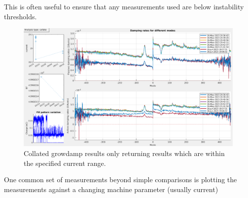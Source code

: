 \documentclass{report}
\begin{document}
This is often useful to ensure that any measurements used are below instability thresholds. 
\begin{figure}[ht]
    \centering
    \includegraphics[width=1\linewidth]{growdamp_collate_limit_current_range.png}
    \caption{Collated growdamp results only returning results which are within the specified current range.}
    \label{fig:growdamp_collated_limit_current_range}
\end{figure}
One common set of measurements beyond simple comparisons is plotting the measurements against a changing machine parameter (usually current) 
\end{document}
